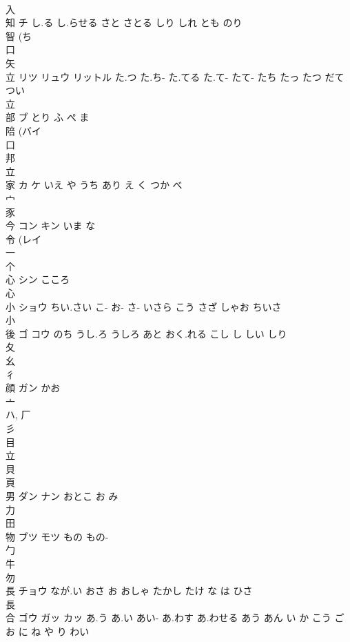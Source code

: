 \documentclass[8pt]{extreport}
\begin{document}
\begin{CJK}{UTF8}{min}
\\	入 
\\	知	チ	し.る し.らせる さと さとる しり しれ とも のり	
\\	智 (ち 
\\	口 
\\	矢 
\\	立	リツ リュウ リットル	た.つ た.ち- た.てる た.て- たて- たち たっ たつ だて つい	
\\	立 
\\	部	ブ	とり ふ ぺ ま	
\\	陪 (バイ 
\\	口 
\\	邦 
\\	立 
\\	家	カ ケ	いえ や うち あり え く つか べ	
\\	宀 
\\	豕 
\\	今	コン キン	いま な	
\\	令 (レイ 
\\	一 
\\	个 
\\	心	シン	こころ	
\\	心 
\\	小	ショウ	ちい.さい こ- お- さ- いさら こう さざ しゃお ちいさ	
\\	小 
\\	後	ゴ コウ	のち うし.ろ うしろ あと おく.れる こし し しい しり	
\\	夂 
\\	幺 
\\	彳 
\\	顔	ガン	かお	
\\	亠 
\\	ハ, 厂 
\\	彡 
\\	目 
\\	立 
\\	貝 
\\	頁 
\\	男	ダン ナン	おとこ お み	
\\	力 
\\	田 
\\	物	ブツ モツ	もの もの-	
\\	勹 
\\	牛 
\\	勿 
\\	長	チョウ	なが.い おさ お おしゃ たかし たけ な は ひさ	
\\	長 
\\	合	ゴウ ガッ カッ	あ.う あ.い あい- あ.わす あ.わせる あう あん い か こう ごお に ね や り わい	

\end{CJK}
\end{document}
